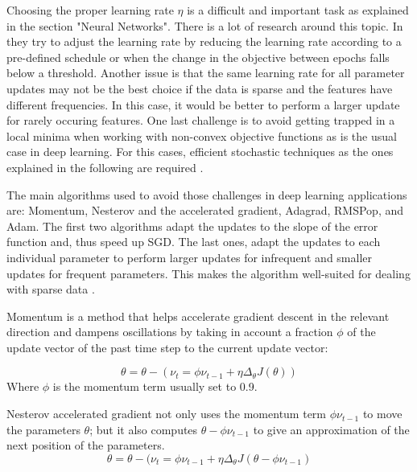 Choosing the proper learning rate $\eta$ is a difficult and important task as explained in the section "Neural Networks". There is a lot of research around this topic. In \cite{robbins1951stochastic} they try to adjust the learning rate by reducing the learning rate according to a pre-defined schedule or when the change in the objective between epochs falls below a threshold. Another issue is that the same learning rate for all parameter updates may not be the best choice if the data is sparse and the features have different frequencies. In this case, it would be better to perform a larger update for rarely occuring features. One last challenge is to avoid getting trapped in a local minima when working with non-convex objective functions as is the usual case in deep learning. For this cases, efficient stochastic techniques as the ones explained in the following are required \cite{ruder2016overview}.

The main algorithms used to avoid those challenges in deep learning applications are: Momentum, Nesterov and the accelerated gradient, Adagrad, RMSPop, and Adam. The first two algorithms adapt the updates to the slope of the error function and, thus speed up SGD. The last ones, adapt the updates to each individual parameter to perform larger updates for infrequent and smaller updates for frequent parameters. This makes the algorithm well-suited for dealing with sparse data \cite{ruder2016overview}.

Momentum \cite{qian1999momentum} is a method that helps accelerate gradient descent in the relevant direction and dampens oscillations by taking in account a fraction $\phi$ of the update vector of the past time step to the current update vector:

\begin{equation}
\theta=\theta-(\nu_t=\phi \nu_{t-1} + \eta \Delta_\theta J(\theta))
\end{equation}
Where $\phi$ is the momentum term usually set to 0.9.


Nesterov accelerated gradient \cite{nesterov1983method} not only uses the momentum term $\phi \nu_{t-1}$  to move the parameters $\theta$; but it also computes $\theta - \phi \nu_{t-1}$ to give an approximation of the next position of the parameters.  
\begin{equation}
\theta=\theta-(\nu_t = \phi \nu_{t-1} + \eta \Delta_\theta J(\theta - \phi \nu_{t-1})
\end{equation}
 
